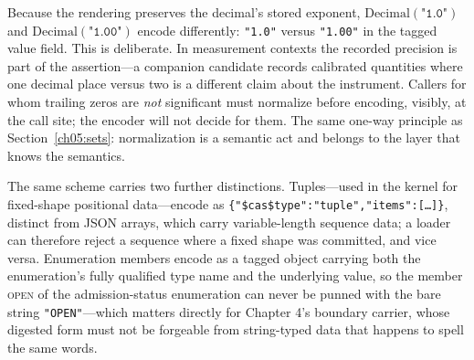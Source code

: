 \begin{remark}\label{ch05:rem:precision}
Because the rendering preserves the decimal's stored exponent,
$\mathrm{Decimal}(\texttt{"1.0"})$ and $\mathrm{Decimal}(\texttt{"1.00"})$
encode differently: \texttt{"1.0"} versus \texttt{"1.00"} in the tagged
value field. This is deliberate. In measurement contexts the recorded
precision is part of the assertion---a companion candidate records
calibrated quantities where one decimal place versus two is a different
claim about the instrument. Callers for whom trailing zeros are \emph{not}
significant must normalize before encoding, visibly, at the call site; the
encoder will not decide for them. The same one-way principle as
Section~\ref{ch05:sets}: normalization is a semantic act and belongs to
the layer that knows the semantics.
\end{remark}

The same scheme carries two further distinctions. Tuples---used in the
kernel for fixed-shape positional data---encode as
\texttt{\{"\$cas\$type":"tuple","items":[\ldots]\}}, distinct from JSON
arrays, which carry variable-length sequence data; a loader can therefore
reject a sequence where a fixed shape was committed, and vice versa.
Enumeration members encode as a tagged object carrying both the
enumeration's fully qualified type name and the underlying value, so the
member \textsc{open} of the admission-status enumeration can never be
punned with the bare string \texttt{"OPEN"}---which matters directly for
Chapter 4's boundary carrier, whose digested form must not be forgeable
from string-typed data that happens to spell the same words.

